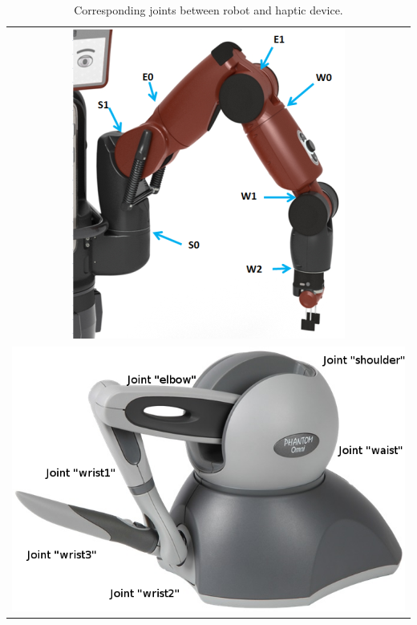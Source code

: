 \documentclass[journal,twoside]{JoPhA}
\begin{document}
\begin{table}
\centering
\begin{tabular}{c}
\includegraphics[scale=1.2]{Images/joint_baxter.png} \\
\includegraphics[scale=0.4]{Images/joint_haptico.png} 
\end{tabular}
\caption{\label{tabla_joints} Corresponding joints between robot and haptic device.}
\end{table}
\end{document}
